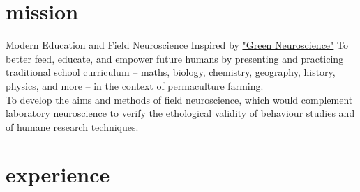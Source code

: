 \documentclass[]{friggeri-cv}
\begin{document}
\section{mission}

\begin{entrylist}
	\entry
	{}
	{Modern Education and Field Neuroscience}
	{Inspired by \href{http://greenneuro.org/principles/}{"Green Neuroscience"}}
	{To better feed, educate, and empower future humans by presenting and practicing traditional school curriculum -- maths, biology, chemistry, geography, history, physics, and more -- in the context of permaculture farming. \\
	To develop the aims and methods of field neuroscience, which would complement laboratory neuroscience to verify the ethological validity of behaviour studies and of humane research techniques.}
\end{entrylist}

\section{experience}
\end{document}
